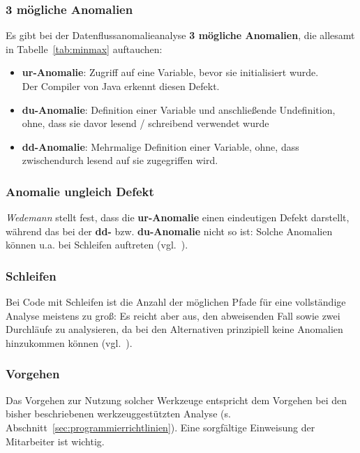 \subsubsection*{3 mögliche Anomalien}
Es gibt bei der Datenflussanomalieanalyse \textbf{3 mögliche Anomalien}, die allesamt in Tabelle~\ref{tab:minmax} auftauchen:

\begin{itemize}
    \item \textbf{ur-Anomalie}: Zugriff auf eine Variable, bevor sie initialisiert wurde.\\
    Der Compiler von Java erkennt diesen Defekt.
    \item \textbf{du-Anomalie}: Definition einer Variable und anschließende Undefinition, ohne, dass sie davor lesend / schreibend verwendet wurde
    \item \textbf{dd-Anomalie}: Mehrmalige Definition einer Variable, ohne, dass zwischendurch lesend auf sie zugegriffen wird.
\end{itemize}

\subsubsection*{Anomalie ungleich Defekt}
\textit{Wedemann} stellt fest, dass die \textbf{ur-Anomalie} einen eindeutigen Defekt darstellt, während das bei der \textbf{dd-} bzw. \textbf{du-Anomalie} nicht so ist: Solche Anomalien können u.a. bei Schleifen auftreten (vgl.~\cite[35]{Wed09c}).

\subsubsection*{Schleifen}
Bei Code mit Schleifen ist die Anzahl der möglichen Pfade für eine vollständige Analyse meistens zu groß: Es reicht aber aus, den abweisenden Fall sowie zwei Durchläufe zu analysieren, da bei den Alternativen prinzipiell keine Anomalien hinzukommen können (vgl.~\cite[35]{Wed09c}).

\subsubsection*{Vorgehen}
Das Vorgehen zur Nutzung solcher Werkzeuge entspricht dem Vorgehen bei den bisher beschriebenen werkzeuggestützten Analyse (s. Abschnitt~\ref{sec:programmierrichtlinien}).
Eine sorgfältige Einweisung der Mitarbeiter ist wichtig.

